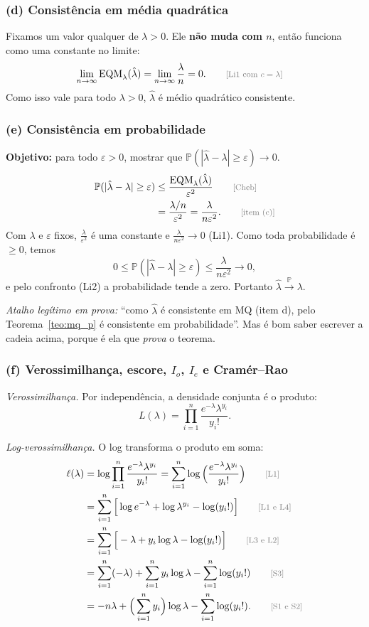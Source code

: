 \documentclass[11pt,a4paper]{article}
\theoremstyle{definition}
\theoremstyle{plain}
\newcommand{\EQM}{\operatorname{EQM}}
\newcommand{\Prob}{\mathbb{P}}
\newcommand{\convP}{\xrightarrow{\;\Prob\;}}
\newcommand{\just}[1]{\tag*{\footnotesize\textcolor{gray}{[#1]}}}
\begin{document}
\subsubsection*{(d) Consistência em média quadrática}
Fixamos um valor qualquer de $\lambda>0$. Ele \textbf{não muda com $n$}, então funciona como uma constante no limite:
\begin{align*}
\lim_{n\to\infty}\EQM_\lambda(\hat\lambda)&=\lim_{n\to\infty}\frac{\lambda}{n}=0 . \just{Li1 com $c=\lambda$}
\end{align*}
Como isso vale para todo $\lambda>0$, $\hat\lambda$ é médio quadrático consistente.

\subsubsection*{(e) Consistência em probabilidade}
\textbf{Objetivo:} para todo $\varepsilon>0$, mostrar que $\Prob(|\hat\lambda-\lambda|\ge\varepsilon)\to0$.
\begin{align*}
\Prob(|\hat\lambda-\lambda|\ge\varepsilon)
&\le\frac{\EQM_\lambda(\hat\lambda)}{\varepsilon^2} \just{Cheb}\\
&=\frac{\lambda/n}{\varepsilon^2}=\frac{\lambda}{n\varepsilon^2}. \just{item (c)}
\end{align*}
Com $\lambda$ e $\varepsilon$ fixos, $\frac{\lambda}{\varepsilon^2}$ é uma constante e $\frac{\lambda}{n\varepsilon^2}\to0$ (Li1). Como toda probabilidade é $\ge0$, temos
\[
0\le\Prob(|\hat\lambda-\lambda|\ge\varepsilon)\le\frac{\lambda}{n\varepsilon^2}\to0,
\]
e pelo confronto (Li2) a probabilidade tende a zero. Portanto $\hat\lambda\convP\lambda$.

\textit{Atalho legítimo em prova:} ``como $\hat\lambda$ é consistente em MQ (item d), pelo Teorema~\ref{teo:mq_p} é consistente em probabilidade''. Mas é bom saber escrever a cadeia acima, porque é ela que \emph{prova} o teorema.

\subsubsection*{(f) Verossimilhança, escore, $I_o$, $I_e$ e Cramér--Rao}

\textit{Verossimilhança.} Por independência, a densidade conjunta é o produto:
\[
L(\lambda)=\prod_{i=1}^n\frac{e^{-\lambda}\lambda^{y_i}}{y_i!}.
\]

\textit{Log-verossimilhança.} O log transforma o produto em soma:
\begin{align*}
\ell(\lambda)&=\log\prod_{i=1}^n\frac{e^{-\lambda}\lambda^{y_i}}{y_i!}
=\sum_{i=1}^n\log\Big(\frac{e^{-\lambda}\lambda^{y_i}}{y_i!}\Big) \just{L1}\\
&=\sum_{i=1}^n\Big[\log e^{-\lambda}+\log\lambda^{y_i}-\log(y_i!)\Big] \just{L1 e L4}\\
&=\sum_{i=1}^n\Big[-\lambda+y_i\log\lambda-\log(y_i!)\Big] \just{L3 e L2}\\
&=\sum_{i=1}^n(-\lambda)+\sum_{i=1}^ny_i\log\lambda-\sum_{i=1}^n\log(y_i!) \just{S3}\\
&=-n\lambda+\Big(\sum_{i=1}^ny_i\Big)\log\lambda-\sum_{i=1}^n\log(y_i!). \just{S1 e S2}
\end{align*}
\end{document}
